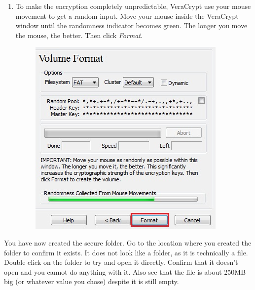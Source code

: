 \documentclass{tufte-handout}
\begin{document}
\begin{enumerate}
	
	\item To make the encryption completely unpredictable, VeraCrypt use your mouse movement to get a random input. Move your mouse inside the VeraCrypt window until the randomness indicator becomes green. The longer you move the mouse, the better. Then click \textit{Format}.
	\begin{figure}%
		\includegraphics[width=.7\linewidth]{img/vc_install_9.png}
	\end{figure}
	\FloatBarrier
\end{enumerate}

	\noindent You have now created the secure folder. Go to the location where you created the folder to confirm it exists. It does not look like a folder, as it is technically a file. Double click on the folder to try and open it directly. Confirm that it doesn't open and you cannot do anything with it. Also see that the file is about 250MB big (or whatever value you chose) despite it is still empty.

\end{document}
